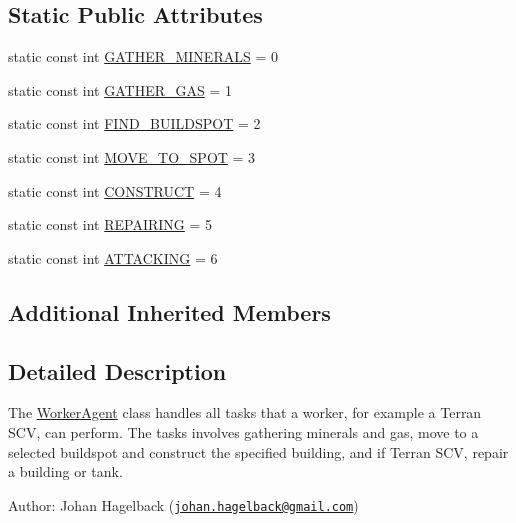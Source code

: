 \subsection*{Static Public Attributes}
\begin{DoxyCompactItemize}
\item 
static const int \hyperlink{class_worker_agent_a80799cc5623ce3f7715df650c2758180}{G\-A\-T\-H\-E\-R\-\_\-\-M\-I\-N\-E\-R\-A\-L\-S} = 0
\item 
static const int \hyperlink{class_worker_agent_a587e98fd64ab6a77970afa3cc154ee1a}{G\-A\-T\-H\-E\-R\-\_\-\-G\-A\-S} = 1
\item 
static const int \hyperlink{class_worker_agent_ae82c1bb4ab0a800baf1ad64700dce8fc}{F\-I\-N\-D\-\_\-\-B\-U\-I\-L\-D\-S\-P\-O\-T} = 2
\item 
static const int \hyperlink{class_worker_agent_a0101af42f6c248f24f8e4ae5d9d9b89c}{M\-O\-V\-E\-\_\-\-T\-O\-\_\-\-S\-P\-O\-T} = 3
\item 
static const int \hyperlink{class_worker_agent_aa6ff635d2c6d5e87c771388b64ae1d4c}{C\-O\-N\-S\-T\-R\-U\-C\-T} = 4
\item 
static const int \hyperlink{class_worker_agent_ad395f66af8916a07f16d08f8c2c4f555}{R\-E\-P\-A\-I\-R\-I\-N\-G} = 5
\item 
static const int \hyperlink{class_worker_agent_a05f75e7ef9ba5d26a338ae4efa3cd90a}{A\-T\-T\-A\-C\-K\-I\-N\-G} = 6
\end{DoxyCompactItemize}
\subsection*{Additional Inherited Members}


\subsection{Detailed Description}
The \hyperlink{class_worker_agent}{Worker\-Agent} class handles all tasks that a worker, for example a Terran S\-C\-V, can perform. The tasks involves gathering minerals and gas, move to a selected buildspot and construct the specified building, and if Terran S\-C\-V, repair a building or tank.

Author\-: Johan Hagelback (\href{mailto:johan.hagelback@gmail.com}{\tt johan.\-hagelback@gmail.\-com}) 

